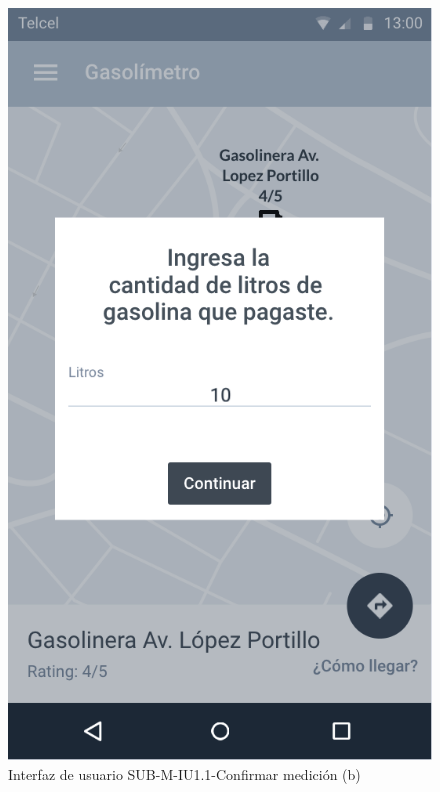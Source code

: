 \begin{figure}[H]
	\centering
	\includegraphics[scale=.55]{Capitulo4/software/submodulos/mediciones/images/sub-m-iu1_1_b}
	\caption{Interfaz de usuario SUB-M-IU1.1-Confirmar medición (b)}
	\label{fig:sub-m-iu1.1.b}
\end{figure}


